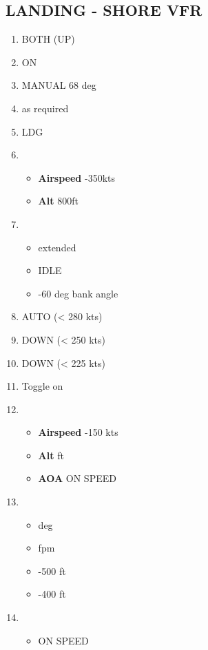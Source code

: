 \documentclass[8pt,usenames,dvipsnames,twoside]{article}
\begin{document}
\begin{multicols*}{2}
		\clearpage
		
		
		
		\subsection{LANDING -  SHORE VFR}
		\begin{enumerate}
			\item {} \dotfill BOTH (UP)
			\item {} \dotfill ON
			\item {} \dotfill MANUAL 68 deg
			\item {} \dotfill as required
			\item {} \dotfill LDG
			\item {}
			\begin{itemize}
				\item \textbf{Airspeed} -350kts
				\item \textbf{Alt} \dotfill 800ft
			\end{itemize}
			\item {}
			\begin{itemize}
				\item {} \dotfill extended
				\item {} \dotfill IDLE 
				\item {} -60 deg bank angle
			\end{itemize}
			\item {} \dotfill AUTO (< 280 kts)
			\item {} \dotfill DOWN (< 250 kts)
			\item {} \dotfill DOWN (< 225 kts)
			\item {} \dotfill Toggle on
			\item {}
			\begin{itemize}
				\item \textbf{Airspeed} -150 kts
				\item \textbf{Alt}  ft
				\item \textbf{AOA} \dotfill ON SPEED
			\end{itemize}
			\item {}
			\begin{itemize}
				\item {}  deg
				\item {}  fpm
				\item {} -500 ft
				\item {} -400 ft
			\end{itemize}
			\item {}
			\begin{itemize}
				\item {} \dotfill ON SPEED
			\end{itemize}
		\end{enumerate}
	

\end{multicols*}
\end{document}
